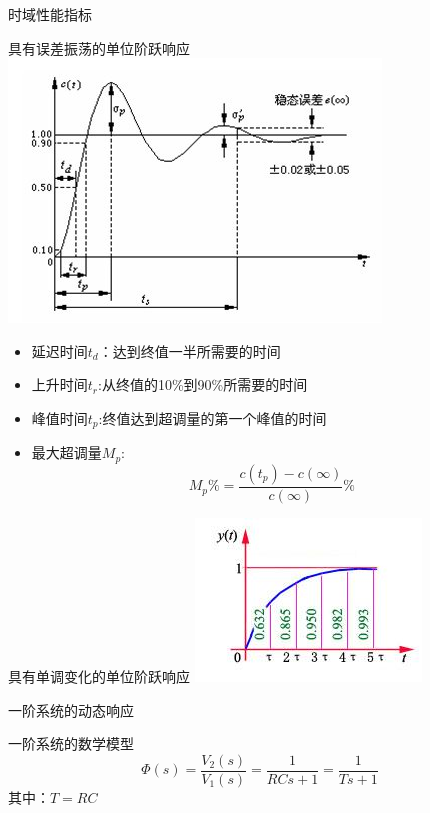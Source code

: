 \begin{frame}{时域性能指标}
\begin{block}{具有误差振荡的单位阶跃响应}
\includegraphics[scale=0.8]{danweijiyao}
\end{block}
\end{frame}
\begin{frame}
\begin{block}{}
\begin{itemize}
\item<+-> 延迟时间$t_d$：达到终值一半所需要的时间
\item<+-> 上升时间$t_r$:从终值的10\%到90\%所需要的时间
\item<+-> 峰值时间$t_p$:终值达到超调量的第一个峰值的时间
\item<+-> 最大超调量$M_p$:
\[M_p\%=\frac{c(t_p)-c(\infty)}{c(\infty)}\%\]
\end{itemize}
\end{block}
\end{frame}
\begin{frame}
\begin{block}{具有单调变化的单位阶跃响应}
\includegraphics[scale=1.2]{onejieyaoimpulse}
\end{block}
\end{frame}
\begin{frame}{一阶系统的动态响应}
\begin{block}{一阶系统的数学模型}
\[\Phi(s)=\frac{V_2(s)}{V_1(s)}=\frac{1}{RCs+1}=\frac{1}{Ts+1}\]
其中：$T=RC$
\end{block}
\end{frame}

